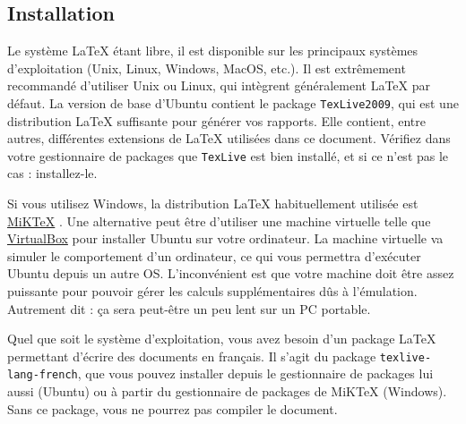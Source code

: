 \documentclass{ceri}
\begin{document}
\subsection{Installation}
\label{sec:installation}
Le système \LaTeX{} étant libre, il est disponible sur les principaux systèmes d'exploitation (Unix, Linux, Windows, MacOS, etc\@.). Il est extrêmement recommandé d'utiliser Unix ou Linux, qui intègrent généralement \LaTeX{} par défaut.
La version de base d'Ubuntu contient le package \texttt{TexLive2009}, qui est une distribution \LaTeX{} suffisante pour générer vos rapports. Elle contient, entre autres, différentes extensions de \LaTeX{} utilisées dans ce document. Vérifiez dans votre gestionnaire de packages que \texttt{TexLive} est bien installé, et si ce n'est pas le cas : installez-le.

Si vous utilisez Windows, la distribution \LaTeX{} habituellement utilisée est \href{http://miktex.org/}{MiKTeX} \cite{MiKTeX2015}. Une alternative peut être d'utiliser une machine virtuelle telle que \href{http://www.virtualbox.org/}{VirtualBox} \cite{Oracle2011} pour installer Ubuntu sur votre ordinateur. La machine virtuelle va simuler le comportement d'un ordinateur, ce qui vous permettra d'exécuter Ubuntu depuis un autre OS. L'inconvénient est que votre machine doit \^etre assez puissante pour pouvoir gérer les calculs supplémentaires d\^us à l'émulation. Autrement dit : ça sera peut-être un peu lent sur un PC portable. 

Quel que soit le système d'exploitation, vous avez besoin d'un package \LaTeX{} permettant d'écrire des documents en français. Il s'agit du package \texttt{texlive-lang-french}, que vous pouvez installer depuis le gestionnaire de packages lui aussi (Ubuntu) ou à partir du gestionnaire de packages de MiKTeX (Windows). Sans ce package, vous ne pourrez pas compiler le document.
\end{document}

